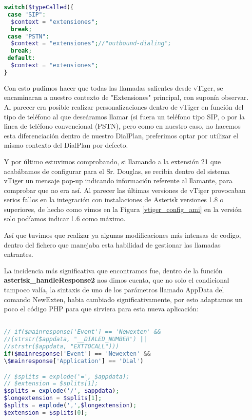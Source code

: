 \begin{lstlisting}[language=php,title={./www/vtigercrm/modules/PBXManager/utils/AsteriskClass.php}]
switch($typeCalled){
 case "SIP":
  $context = "extensiones";
  break;
 case "PSTN":
  $context = "extensiones";//"outbound-dialing";
  break;
 default:
  $context = "extensiones";
}
\end{lstlisting}

Con esto pudimos hacer que todas las llamadas salientes desde vTiger, se encaminaran a nuestro contexto de "Extensiones" principal, con suponía observar. Al parecer era posible realizar personalizaciones dentro de vTiger en función del tipo de teléfono al que deseáramos llamar (si fuera un teléfono tipo SIP, o por la linea de teléfono convencional (PSTN), pero como en nuestro caso, no hacemos esta diferenciación dentro de nuestro DialPlan, preferimos optar por utilizar el mismo contexto del DialPlan por defecto.

Y por último estuvimos comprobando, si llamando a la extensión 21 que acabábamos de configurar para el Sr. Douglas, se recibía dentro del sistema vTiger un mensaje pop-up indicando información referente al llamante, para comprobar que no era así. Al parecer las últimas versiones de vTiger provocaban serios fallos en la integración con instalaciones de Asterisk versiones 1.8 o superiores, de hecho como vimos en la Figura \ref{vtiger_config_ami} en la versión solo podíamos indicar 1.6 como máximo. 

Así que tuvimos que realizar ya algunas modificaciones más intensas de codigo, dentro del fichero que manejaba esta habilidad de gestionar las llamadas entrantes.

La incidencia más significativa que encontramos fue, dentro de la función \textbf{asterisk\_handleResponse2} nos dimos cuenta, que no solo el condicional tampoco valía, la sintaxis de uno de los parámetros llamado AppData del comando NewExten, habia cambiado significativamente, por esto adaptamos un poco el código PHP para que sirviera para esta nueva aplicación:

\begin{lstlisting}[language=php,title={./www/vtigercrm/cron/modules/PBXManager/AsteriskClient.php}]

// if($mainresponse['Event'] == 'Newexten' && 
//(strstr($appdata, "__DIALED_NUMBER") || 
//strstr($appdata, "EXTTOCALL")))
if($mainresponse['Event'] == 'Newexten' && 
\$mainresponse['Application'] == 'Dial')

// $splits = explode('=', $appdata);
// $extension = $splits[1];
$splits = explode('/', $appdata); 
$longextension = $splits[1];
$splits = explode(',',$longextension);
$extension = $splits[0];

\end{lstlisting}

